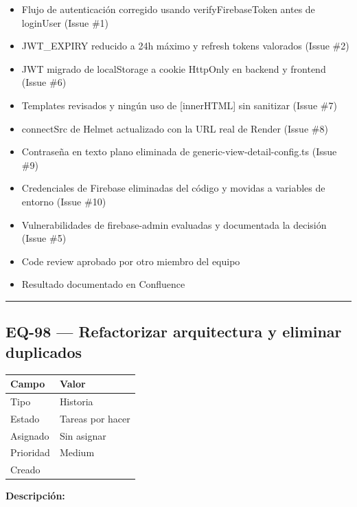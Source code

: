 \documentclass[
  spanish,
  11pt,
]{report}
\newcounter{none} %
\providecommand{\tightlist}{%
  \setlength{\itemsep}{0pt}\setlength{\parskip}{0pt}}
\begin{document}
\begin{itemize}
\tightlist
\item
  Flujo de autenticación corregido usando verifyFirebaseToken antes de
  loginUser (Issue \#1)
\item
  JWT\_EXPIRY reducido a 24h máximo y refresh tokens valorados (Issue
  \#2)
\item
  JWT migrado de localStorage a cookie HttpOnly en backend y frontend
  (Issue \#6)
\item
  Templates revisados y ningún uso de {[}innerHTML{]} sin sanitizar
  (Issue \#7)
\item
  connectSrc de Helmet actualizado con la URL real de Render (Issue \#8)
\item
  Contraseña en texto plano eliminada de generic-view-detail-config.ts
  (Issue \#9)
\item
  Credenciales de Firebase eliminadas del código y movidas a variables
  de entorno (Issue \#10)
\item
  Vulnerabilidades de firebase-admin evaluadas y documentada la decisión
  (Issue \#5)
\item
  Code review aprobado por otro miembro del equipo
\item
  Resultado documentado en Confluence
\end{itemize}

\begin{center}\rule{0.5\linewidth}{0.5pt}\end{center}

\subsection{EQ-98 --- Refactorizar arquitectura y eliminar
duplicados}\label{eq-98-refactorizar-arquitectura-y-eliminar-duplicados}

{\def\LTcaptype{none} %
\begin{longtable}[]{@{}ll@{}}
\toprule\noalign{}
Campo & Valor \\
\midrule\noalign{}
\endhead
\bottomrule\noalign{}
\endlastfoot
Tipo & Historia \\
Estado & Tareas por hacer \\
Asignado & Sin asignar \\
Prioridad & Medium \\
Creado & \\
\end{longtable}
}

\textbf{Descripción:}
\end{document}
